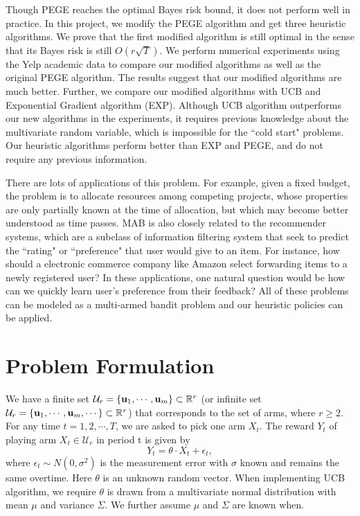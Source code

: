 \documentclass{article}
\theoremstyle{plain}
\theoremstyle{definition}
\begin{document}
Though PEGE reaches the optimal Bayes risk bound, it does not perform well in practice. In this project, we modify the PEGE algorithm and get three heuristic algorithms. We prove that the first modified algorithm is still optimal in the sense that its Bayes risk is still $O(r\sqrt{T})$. We perform numerical experiments using the Yelp academic data to compare our modified algorithms as well as the original PEGE algorithm. The results suggest that our modified algorithms are much better. Further, we compare our modified algorithms with UCB and Exponential Gradient algorithm (EXP). Although UCB algorithm outperforms our new algorithms in the experiments, it requires previous knowledge about the multivariate random variable, which is impossible for the ``cold start" problems. Our heuristic algorithms perform better than EXP and PEGE, and do not require any previous information.

There are lots of applications of this problem. For example, given a fixed budget, the problem is to allocate resources among competing projects, whose properties are only partially known at the time of allocation, but which may become better understood as time passes. MAB is also closely related to the recommender systems, which are a subclass of information filtering system that seek to predict the ``rating" or ``preference" that user would give to an item. For instance, how should a electronic commerce company like Amazon select forwarding items to a newly registered user? In these applications, one natural question would be how can we quickly learn user's preference from their feedback? All of these problems can be modeled as a multi-armed bandit problem and our heuristic policies can be applied.





\section{Problem Formulation}
We have a finite set $\mathcal{U}_{r}=\{\bold{u}_{1},\cdots,\bold{u}_{m}\}\subset \mathbb{R}^{r}$ (or infinite set $\mathcal{U}_{r}=\{\bold{u}_{1},\cdots,\bold{u}_{m},\cdots\}\subset \mathbb{R}^{r}$) that corresponds to the set of arms, where $r\geq 2$. For any time $t=1,2,\cdots,T$, we are asked to pick one arm $X_{t}$. The reward $Y_{t}$ of playing arm $X_{t}\in \mathcal{U}_{r}$ in period t is given by
\begin{equation}
Y_{t} = \theta \cdot X_{t} + \epsilon_{t}, \nonumber
\end{equation}
where $\epsilon_{t}\sim N(0,\sigma^{2})$ is the measurement error with $\sigma$ known and remains the same overtime. Here $\theta$ is an unknown random vector. When implementing UCB algorithm, we require $\theta$ is drawn from a multivariate normal distribution with mean $\mu$ and variance $\Sigma$. We further assume $\mu$ and $\Sigma$ are known when. 
\end{document}
